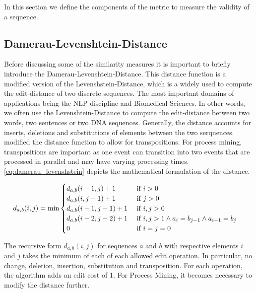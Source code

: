 \documentclass[./../../paper.tex]{subfiles}
\begin{document}
In this section we define the components of the metric to measure the validity of a sequence.

\subsection{Damerau-Levenshtein-Distance}
Before discussing some of the similarity measures it is important to briefly introduce the Damerau-Levenshtein-Distance. This distance function is a modified version of the Levenshstein-Distance\autocite{levenshtein_binary_1965}, which is a widely used to compute the edit-distance of two discrete sequences. The most important domains of applications being the \gls{NLP} discipline and Biomedical Sciences. In other words, we often use the Levenshtein-Distance to compute the edit-distance between two words, two sentences or two DNA sequences. Generally, the distance accounts for inserts, deletions and substitutions of elements between the two serquences.
\citeauthor{damerau_technique_1964} modified the distance function to allow for transpositions. For process mining, transpositions are important as one event can transition into two events that are processed in parallel and may have varying processing times. \autoref{eq:damerau_levenshstein} depicts the mathematical formulation of the distance.   

\begin{align}
    \label{eq:damerau_levenshstein}
    d_{a, b}(i, j) & =\min
    \begin{cases}
        d_{a, b}(i-1, j  )+ 1 & \text { if } i>0                                            \\
        d_{a, b}(i  , j-1)+ 1 & \text { if } j>0                                            \\
        d_{a, b}(i-1, j-1)+ 1 & \text { if } i, j>0                                         \\
        d_{a, b}(i-2, j-2)+ 1 & \text { if } i, j>1 \land a_{i}=b_{j-1} \land a_{i-1}=b_{j} \\
        0                                 & \text { if } i=j=0                                         
    \end{cases}        
\end{align}

The recursive form $d_{a, b}(i, j)$ for sequences $a$ and $b$ with respective elements $i$ and $j$ takes the minimum of each of each allowed edit operation. In particular, no change, deletion, insertion, substitution and transposition. For each operation, the algorithm adds an edit cost of 1. For Process Mining, it becomes necessary to modify the distance further. 
\end{document}
